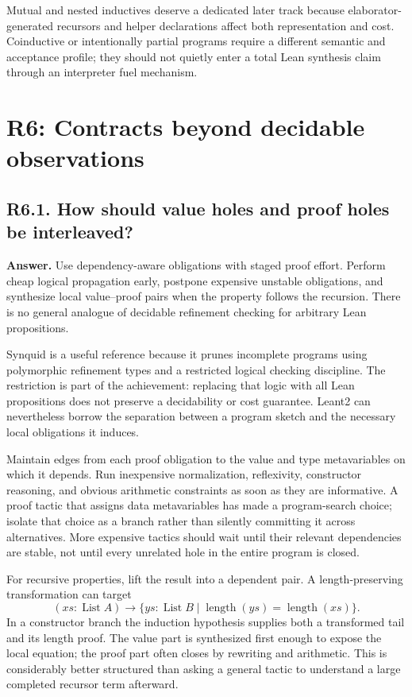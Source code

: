 \documentclass[11pt,a4paper]{article}
\newcommand{\question}[2]{\subsection{#1. #2}\label{q:#1}}
\newcommand{\List}{\operatorname{List}}
\theoremstyle{definition}
\theoremstyle{remark}
\begin{document}
Mutual and nested inductives deserve a dedicated later track because elaborator-generated recursors and helper declarations affect both representation and cost. Coinductive or intentionally partial programs require a different semantic and acceptance profile; they should not quietly enter a total Lean synthesis claim through an interpreter fuel mechanism.

\section{R6: Contracts beyond decidable observations}\label{sec:r6}

\question{R6.1}{How should value holes and proof holes be interleaved?}

\textbf{Answer.} Use dependency-aware obligations with staged proof effort. Perform cheap logical propagation early, postpone expensive unstable obligations, and synthesize local value--proof pairs when the property follows the recursion. There is no general analogue of decidable refinement checking for arbitrary Lean propositions.

Synquid is a useful reference because it prunes incomplete programs using polymorphic refinement types and a restricted logical checking discipline.\cite{synquid} The restriction is part of the achievement: replacing that logic with all Lean propositions does not preserve a decidability or cost guarantee. Leant2 can nevertheless borrow the separation between a program sketch and the necessary local obligations it induces.

Maintain edges from each proof obligation to the value and type metavariables on which it depends. Run inexpensive normalization, reflexivity, constructor reasoning, and obvious arithmetic constraints as soon as they are informative. A proof tactic that assigns data metavariables has made a program-search choice; isolate that choice as a branch rather than silently committing it across alternatives. More expensive tactics should wait until their relevant dependencies are stable, not until every unrelated hole in the entire program is closed.

For recursive properties, lift the result into a dependent pair. A length-preserving transformation can target
\[
 (xs:\List A)\to
 \{ys:\List B\mid \operatorname{length}(ys)=\operatorname{length}(xs)\}.
\]
In a constructor branch the induction hypothesis supplies both a transformed tail and its length proof. The value part is synthesized first enough to expose the local equation; the proof part often closes by rewriting and arithmetic. This is considerably better structured than asking a general tactic to understand a large completed recursor term afterward.
\end{document}
